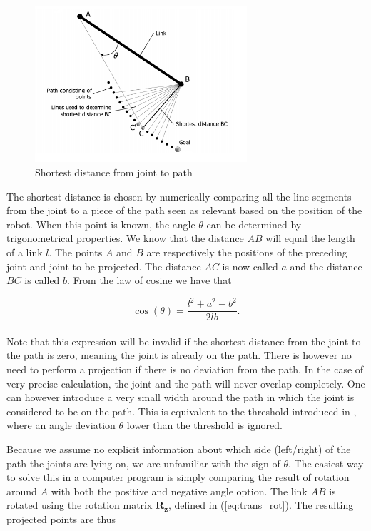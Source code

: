 \begin{figure}[h!]
    \centering
    \includegraphics[width=0.7\textwidth]{figures/path_proj.PNG}
    \caption{Shortest distance from joint to path \cite{conkur2008path}}
    \label{fig:path_proj}
\end{figure}

The shortest distance is chosen by numerically comparing all the line segments from the joint to a piece of the path seen as relevant based on the position of the robot. When this point is known, the angle $\theta$ can be determined by trigonometrical properties. We know that the distance $AB$ will equal the length of a link $l$. The points $A$ and $B$ are respectively the positions of the preceding joint and joint to be projected. The distance $AC$ is now called $a$ and the distance $BC$ is called $b$. From the law of cosine we have that

\begin{equation}
    \cos{(\theta)} = \frac{l^2 + a^2 - b^2}{2lb}.
\end{equation}
\\
Note that this expression will be invalid if the shortest distance from the joint to the path is zero, meaning the joint is already on the path. There is however no need to perform a projection if there is no deviation from the path. In the case of very precise calculation, the joint and the path will never overlap completely. One can however introduce a very small width around the path in which the joint is considered to be on the path. This is equivalent to the threshold introduced in \cite{conkur2008path}, where an angle deviation $\theta$ lower than the threshold is ignored.

Because we assume no explicit information about which side (left/right) of the path the joints are lying on, we are unfamiliar with the sign of $\theta$. The easiest way to solve this in a computer program is simply comparing the result of rotation around $A$ with both the positive and negative angle option. The link $AB$ is rotated using the rotation matrix $\mathbf{R_z}$, defined in (\ref{eq:trans_rot}). The resulting projected points are thus

